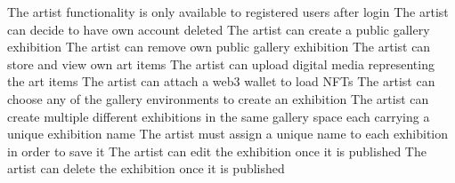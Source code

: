     The artist functionality is only available to registered users after login
    The artist can decide to have own account deleted
    The artist can create a public gallery exhibition
    The artist can remove own public gallery exhibition
    The artist can store and view own art items
    The artist can upload digital media representing the art items
    The artist can attach a web3 wallet to load NFTs
    The artist can choose any of the gallery environments to create an exhibition
    The artist can create multiple different exhibitions in the same gallery space each carrying a unique exhibition name
    The artist must assign a unique name to each exhibition in order to save it
    The artist can edit the exhibition once it is published
    The artist can delete the exhibition once it is published


